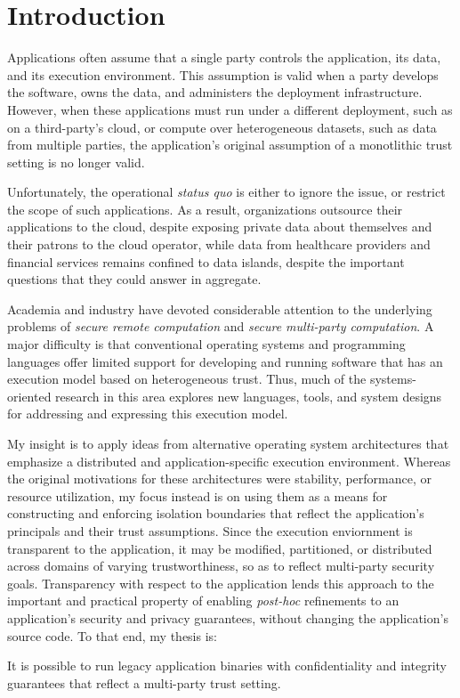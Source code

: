 \section{Introduction}
\label{sec:intro}

Applications often assume that a single party controls the application, its
data, and its execution environment.
%
This assumption is valid when a party develops the software, owns the data, 
and administers the deployment infrastructure.
%
However, when these applications must run under a different deployment, such as
on a third-party's cloud, or compute over heterogeneous datasets, such as data
from multiple parties, the application's original assumption of a monotlithic
trust setting is no longer valid.


Unfortunately, the operational \emph{status quo} is either to ignore the issue,
or restrict the scope of such applications.  
%
As a result, organizations outsource their applications to the cloud, despite
exposing private data about themselves and their patrons to the cloud operator,
while data from healthcare providers and financial services remains confined to
data islands, despite the important questions that they could answer in
aggregate.



Academia and industry have devoted considerable attention to the underlying
problems of \emph{secure remote computation} and \emph{secure multi-party
computation}.
%
A major difficulty is that conventional operating systems and
programming languages offer limited support for developing and running software
that has an execution model based on heterogeneous trust.
%
Thus, much of the systems-oriented research in this area explores new
languages, tools, and system designs for addressing and expressing this
execution model.


My insight is to apply ideas from alternative operating system
architectures that emphasize a distributed and application-specific execution
environment.
%
Whereas the original motivations for these architectures were stability,
performance, or resource utilization, my focus instead is on using them as a
means for constructing and enforcing isolation boundaries that reflect the
application's principals and their trust assumptions.
%
Since the execution enviornment is transparent to the application, 
it may be modified, partitioned, or distributed across domains of varying
trustworthiness, so as to reflect multi-party security goals.
%
Transparency with respect to the application lends this approach to the
important and practical property of enabling \emph{post-hoc} refinements to an
application's security and privacy guarantees, without changing the
application's source code.
To that end, my thesis is:
\begin{displayquote}
    It is possible to run legacy application binaries with confidentiality and 
    integrity guarantees that reflect a multi-party trust setting.
\end{displayquote}


